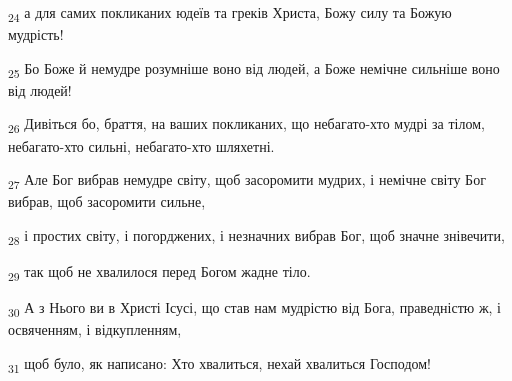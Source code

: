 \begin{tcolorbox}
\textsubscript{24} а для самих покликаних юдеїв та греків Христа, Божу силу та Божую мудрість!
\end{tcolorbox}
\begin{tcolorbox}
\textsubscript{25} Бо Боже й немудре розумніше воно від людей, а Боже немічне сильніше воно від людей!
\end{tcolorbox}
\begin{tcolorbox}
\textsubscript{26} Дивіться бо, браття, на ваших покликаних, що небагато-хто мудрі за тілом, небагато-хто сильні, небагато-хто шляхетні.
\end{tcolorbox}
\begin{tcolorbox}
\textsubscript{27} Але Бог вибрав немудре світу, щоб засоромити мудрих, і немічне світу Бог вибрав, щоб засоромити сильне,
\end{tcolorbox}
\begin{tcolorbox}
\textsubscript{28} і простих світу, і погорджених, і незначних вибрав Бог, щоб значне знівечити,
\end{tcolorbox}
\begin{tcolorbox}
\textsubscript{29} так щоб не хвалилося перед Богом жадне тіло.
\end{tcolorbox}
\begin{tcolorbox}
\textsubscript{30} А з Нього ви в Христі Ісусі, що став нам мудрістю від Бога, праведністю ж, і освяченням, і відкупленням,
\end{tcolorbox}
\begin{tcolorbox}
\textsubscript{31} щоб було, як написано: Хто хвалиться, нехай хвалиться Господом!
\end{tcolorbox}
